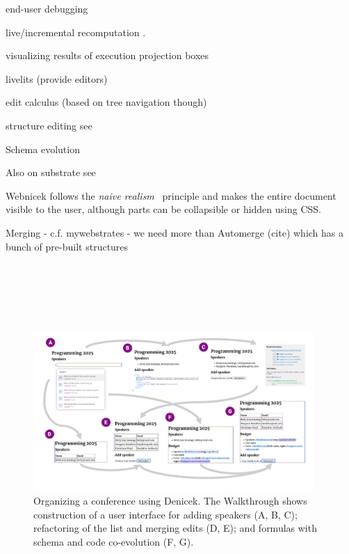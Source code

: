 \documentclass[sigconf,anonymous,screen]{acmart}
\begin{document}
end-user debugging
\cite{kissinger-2006-debugging}

live/incremental recomputation
\cite{mcdirmid-2013-usable,horowitz-2023-engraft,petricek-2020-live}.

visualizing results of execution
projection boxes \cite{lerner-2020-boxes}

livelits (provide editors)
\cite{omar-2021-livelits}

edit calculus (based on tree navigation though)
\cite{omar-2017-hazelnut}

structure editing see \cite{beckman-2023-sandblocks}

Schema evolution

Also on substrate see



Webnicek follows the \emph{naive realism}~\cite{disessa-1986-boxer} principle and makes the entire
document visible to the user, although parts can be collapsible or hidden using CSS.


Merging - c.f. mywebstrates - we need more than Automerge (cite)
which has a bunch of pre-built structures

~

~

~


\begin{figure}[t]
\vspace{-0.5em}
\includegraphics[width=0.95\textwidth,clip,trim=1cm 1cm 1cm 0.5cm]{fig/walkthrough.pdf}
\vspace{-1em}
\caption{Organizing a conference using Denicek. The Walkthrough shows construction of a user
  interface for adding speakers (A, B, C); refactoring of the list and merging edits (D, E); and
  formulas with schema and code co-evolution (F, G).}
\label{fig:walkthrough}
\end{figure}
\end{document}
